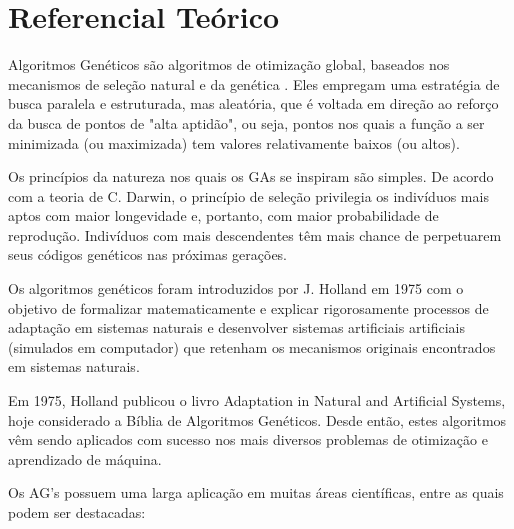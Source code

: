 \documentclass[conference]{IEEEtran}
\begin{document}
\section{Referencial Teórico}

Algoritmos Genéticos são algoritmos de otimização global, baseados nos mecanismos de seleção natural e da genética \cite{b2}. Eles empregam uma estratégia de busca paralela e estruturada, mas aleatória, que é voltada em direção ao reforço da busca de pontos de "alta aptidão", ou seja, pontos nos quais a função a ser minimizada (ou maximizada) tem valores relativamente baixos (ou altos).

Os princípios da natureza nos quais os GAs se inspiram são simples. De  acordo com  a teoria de C. Darwin, o princípio de seleção privilegia os indivíduos mais aptos com maior longevidade e, portanto, com maior probabilidade de reprodução. Indivíduos  com  mais descendentes têm mais chance de perpetuarem seus códigos genéticos nas próximas   gerações.

Os algoritmos genéticos foram introduzidos por J. Holland em 1975 \cite{b1} com o objetivo de formalizar matematicamente e explicar rigorosamente processos de adaptação em sistemas naturais e desenvolver sistemas artificiais artificiais (simulados em computador) que retenham os mecanismos originais encontrados em  sistemas  naturais. 

Em 1975, Holland publicou o livro Adaptation in Natural and Artificial Systems, hoje considerado a Bíblia de Algoritmos Genéticos. Desde então, estes algoritmos vêm sendo aplicados com sucesso nos mais diversos problemas de otimização e aprendizado de máquina. 

Os AG's possuem uma larga aplicação em muitas áreas científicas, entre as quais podem ser destacadas:
    
\end{document}
